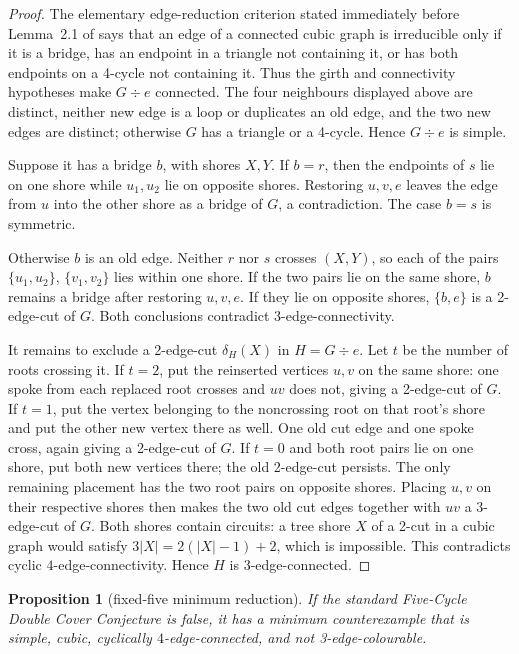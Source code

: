 \documentclass[11pt]{article}
\newtheorem{proposition}[theorem]{Proposition}
\theoremstyle{definition}
\theoremstyle{remark}
\begin{document}
\begin{proof}
The elementary edge-reduction criterion stated immediately before
Lemma~2.1 of \cite{BrinkmannGoedgebeurMcKay2011} says that an edge of a
connected cubic graph is irreducible only if it is a bridge, has an
endpoint in a triangle not containing it, or has both endpoints on a
4-cycle not containing it.  Thus the girth and connectivity hypotheses
make \(G\div e\) connected.  The four neighbours displayed above are
distinct, neither new edge is a loop or duplicates an old edge, and the
two new edges are distinct; otherwise \(G\) has a triangle or a
4-cycle.  Hence \(G\div e\) is simple.

Suppose it has a bridge \(b\), with shores \(X,Y\).  If \(b=r\), then
the endpoints of \(s\) lie on one shore while \(u_1,u_2\) lie on
opposite shores.  Restoring \(u,v,e\) leaves the edge from \(u\) into
the other shore as a bridge of \(G\), a contradiction.  The case
\(b=s\) is symmetric.

Otherwise \(b\) is an old edge.  Neither \(r\) nor \(s\) crosses
\((X,Y)\), so each of the pairs \(\{u_1,u_2\}\), \(\{v_1,v_2\}\)
lies within one shore.  If the two pairs lie on the same shore, \(b\)
remains a bridge after restoring \(u,v,e\).  If they lie on opposite
shores, \(\{b,e\}\) is a 2-edge-cut of \(G\).  Both conclusions
contradict 3-edge-connectivity.

It remains to exclude a 2-edge-cut \(\delta_H(X)\) in \(H=G\div e\).
Let \(t\) be the number of roots crossing it.  If \(t=2\), put the
reinserted vertices \(u,v\) on the same shore: one spoke from each
replaced root crosses and \(uv\) does not, giving a 2-edge-cut of \(G\).
If \(t=1\), put the vertex belonging to the noncrossing root on that
root's shore and put the other new vertex there as well.  One old cut
edge and one spoke cross, again giving a 2-edge-cut of \(G\).  If
\(t=0\) and both root pairs lie on one shore, put both new vertices
there; the old 2-edge-cut persists.  The only remaining placement has
the two root pairs on opposite shores.  Placing \(u,v\) on their
respective shores then makes the two old cut edges together with \(uv\)
a 3-edge-cut of \(G\).
Both shores contain circuits: a tree shore \(X\) of a 2-cut in a cubic
graph would satisfy
\(3|X|=2(|X|-1)+2\), which is impossible.  This contradicts cyclic
\(4\)-edge-connectivity.  Hence \(H\) is 3-edge-connected.
\end{proof}

\begin{proposition}[fixed-five minimum reduction]
\label{prop:fixed-five-reduction}
If the standard Five-Cycle Double Cover Conjecture is false, it has a
minimum counterexample that is simple, cubic, cyclically
\(4\)-edge-connected, and not 3-edge-colourable.
\end{proposition}
\end{document}
